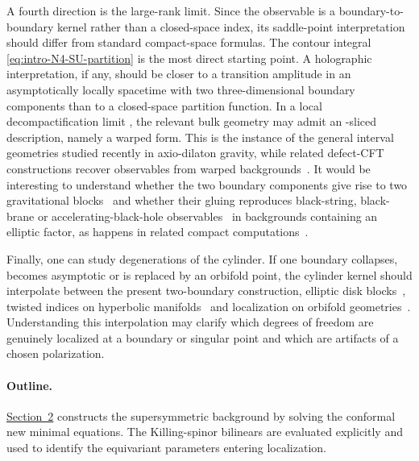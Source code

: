 \documentclass[11pt,a4paper]{article}
\makeatletter
\numberwithin{equation}{section}
\theoremstyle{plain}
\theoremstyle{definition}
\theoremstyle{remark}
\newcounter{mathrecordid}
\newcommand{\mathboxbegin}[1]{%
  \stepcounter{mathrecordid}%
  \immediate\write\mathrecords{\themathrecordid,#1}%
  \special{pdf:bann << /Type /Annot /Subtype /Link /Border [0 0 0]
    /MathBoxID \themathrecordid /F 2
    /A << /S /URI /URI (urn:mathbox:\themathrecordid) >> >>}}
\newcommand{\mathboxinlineplain}[1]{$#1$}
\newcommand{\mathboxinline}[1]{%
  $\mathboxbegin{inline}#1\special{pdf:eann}$}
\newcommand{\recordmath}{%
  \ifmeasuring@\expandafter\mathboxinlineplain
  \else\expandafter\mathboxinline\fi}
\makeatother
\begin{document}
A fourth direction is the large-rank limit.  Since the observable is a boundary-to-boundary kernel rather than a closed-space index, its saddle-point interpretation should differ from standard compact-space formulas.  The  \recordmath{SU(N)} \recordmath{\mathcal N=4} contour integral \eqref{eq:intro-N4-SU-partition} is the most direct starting point. A holographic interpretation, if any, should be closer to a transition amplitude in an asymptotically locally \recordmath{AdS_5} spacetime with two three-dimensional boundary components than to a closed-space partition function.  In a local decompactification limit \recordmath{T^3\simeq\mathbb R^3}, the relevant bulk geometry may admit an \recordmath{AdS_4}-sliced description, namely a warped \recordmath{AdS_4\times I} form.  This is the \recordmath{D=4} instance of the general \recordmath{AdS_D\times I} interval geometries studied recently in axio-dilaton gravity, while related defect-CFT constructions recover observables from warped \recordmath{AdS_p\times S^q\times I} backgrounds~\cite{Faedo:2026defect,Dibitetto:2026axiodilaton,Dibitetto:2026adsnine}.  It would be interesting to understand whether the two boundary components give rise to two gravitational blocks~\cite{Hosseini:2019iad} and whether their gluing reproduces black-string, black-brane or accelerating-black-hole observables~\cite{Benini:2013cda} in backgrounds containing an elliptic factor, as happens in related compact computations~\cite{Hosseini:2016tor,Hosseini:2019lkt,Hong:2018viz,Inglese:2023wky,Colombo:2024mts}.

Finally, one can study degenerations of the cylinder.  If one boundary collapses, becomes asymptotic or is replaced by an orbifold point, the cylinder kernel should interpolate between the present two-boundary construction, elliptic disk blocks~\cite{Longhi:2019hdh}, twisted indices on hyperbolic manifolds~\cite{Pittelli:2018rpl,Iannotti:2023jji} and localization on orbifold geometries~\cite{Inglese:2023wky,Inglese:2023tyc,Pittelli:2024ugf}.  Understanding this interpolation may clarify which degrees of freedom are genuinely localized at a boundary or singular point and which are artifacts of a chosen polarization.

\paragraph{Outline.}

\hyperref[sec:geometry-loc]{Section~2} constructs the supersymmetric background by solving the conformal new minimal equations. The Killing-spinor bilinears are evaluated explicitly and used to identify the equivariant parameters entering localization.
\end{document}
